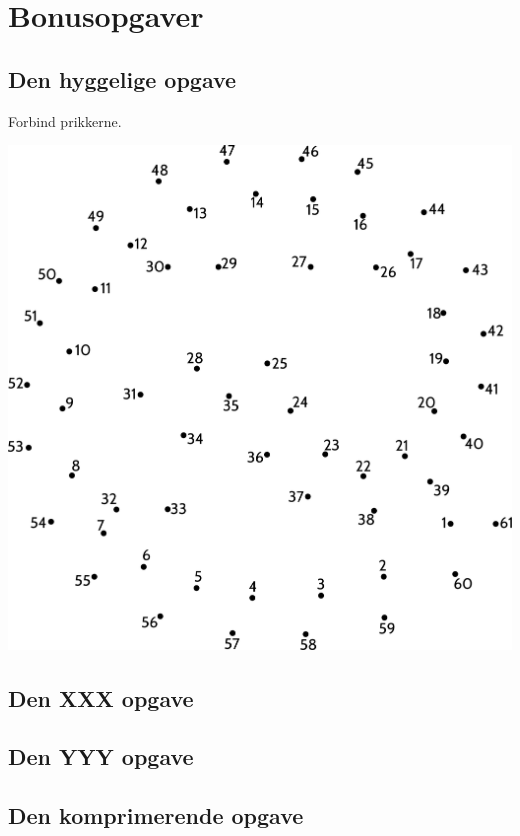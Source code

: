 \section{\huge{Bonusopgaver}}

\subsection{Den hyggelige opgave}

Forbind prikkerne.

\begin{center}
\includegraphics[width=.99\textwidth]{forbind-prikkerne.pdf}
\end{center}


\newpage

\subsection{Den XXX opgave}


\newpage

\subsection{Den YYY opgave}


\newpage

\subsection{Den komprimerende opgave}

